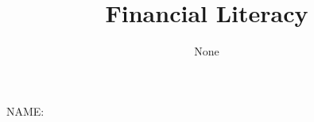 \documentclass[10pt,a5paper]{sdapsclassic}
\title{Financial Literacy}
\author{None}
\begin{document}
	\begin{questionnaire}
	[noinfo]
\begin{choicequestion}
NAME:
\end{choicequestion}
	\end{questionnaire}
\end{document}
